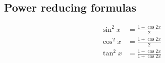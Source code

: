 \subsection*{Power reducing formulas}

\begin{align*}
  \sin^2 x  &= \frac{1 - \cos 2x}{2}\\
  \cos^2 x  &= \frac{1 + \cos 2x}{2}\\
  \tan^2 x  &= \frac{1 - \cos 2x}{1 + \cos 2x}
\end{align*}